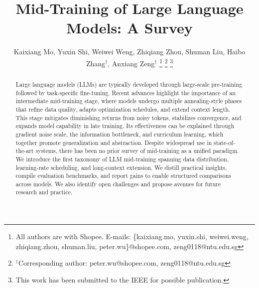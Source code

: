 \documentclass[lettersize,journal]{IEEEtran}
\title{Mid-Training of Large Language Models: A Survey}
\author{Kaixiang Mo, Yuxin Shi, Weiwei Weng, Zhiqiang Zhou, Shuman Liu, Haibo Zhang$^\dagger$, Anxiang Zeng$^\dagger$
\thanks{All authors are with Shopee. E-mails: \{kaixiang.mo, yuxin.shi, weiwei.weng, zhiqiang.zhou, shuman.liu, peter.wu\}@shopee.com, zeng0118@ntu.edu.sg}%
\thanks{$^\dagger$Corresponding author: peter.wu@shopee.com, zeng0118@ntu.edu.sg}
\thanks{This work has been submitted to the IEEE for possible publication.}}
\theoremstyle{definition}
\begin{document}
\maketitle



\begin{abstract}
Large language models (LLMs) are typically developed through large-scale pre-training followed by task-specific fine-tuning. Recent advances highlight the importance of an intermediate mid-training stage, where models undergo multiple annealing-style phases that refine data quality, adapts optimization schedules, and extend context length. This stage mitigates diminishing returns from noisy tokens, stabilizes convergence, and expands model capability in late training. Its effectiveness can be explained through gradient noise scale, the information bottleneck, and curriculum learning, which together promote generalization and abstraction. Despite widespread use in state-of-the-art systems, there has been no prior survey of mid-training as a unified paradigm. 
We introduce the first taxonomy of LLM mid-training spanning data distribution, learning-rate scheduling, and long-context extension. We distill practical insights, compile evaluation benchmarks, and report gains to enable structured comparisons across models. We also identify open challenges and propose avenues for future research and practice.

\end{abstract}







% 
% 

% 
\end{document}
